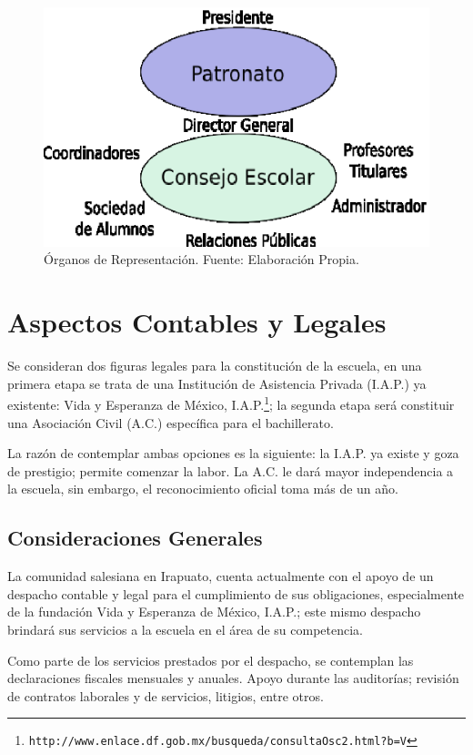 \begin{figure}[h]
	\centering
	\includegraphics{images/organos}
	\caption{Órganos de Representación. Fuente: Elaboración Propia.}
	\label{fig:Org:Organos}
\end{figure}
\clearpage

\section{Aspectos Contables y Legales}

Se consideran dos figuras legales para la constitución de la escuela, en una primera etapa se trata de una Institución de Asistencia Privada (I.A.P.) ya existente: Vida y Esperanza de México, I.A.P.\footnote{\texttt{http://www.enlace.df.gob.mx/busqueda/consultaOsc2.html?b=V}}; la segunda etapa será constituir una Asociación Civil (A.C.) específica para el bachillerato.

La razón de contemplar ambas opciones es la siguiente: la I.A.P. ya existe y goza de prestigio; permite comenzar la labor. La A.C. le dará mayor independencia a la escuela, sin embargo, el reconocimiento oficial toma más de un año.

\subsection{Consideraciones Generales}

La comunidad salesiana en Irapuato, cuenta actualmente con el apoyo de un despacho contable y legal para el cumplimiento de sus obligaciones, especialmente de la fundación Vida y Esperanza de México, I.A.P.; este mismo despacho brindará sus servicios a la escuela en el área de su competencia.

Como parte de los servicios prestados por el despacho, se contemplan las declaraciones fiscales mensuales y anuales. Apoyo durante las auditorías; revisión de contratos laborales y de servicios, litigios, entre otros.

